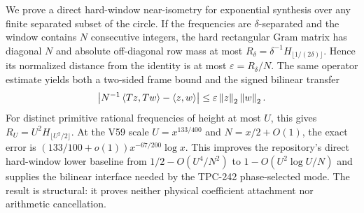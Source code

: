 We prove a direct hard-window near-isometry for exponential synthesis over any
finite separated subset of the circle.  If the frequencies are
$\delta$-separated and the window contains $N$ consecutive integers, the
hard rectangular Gram matrix has diagonal $N$ and absolute off-diagonal row
mass at most
$R_\delta=\delta^{-1}H_{\lfloor1/(2\delta)\rfloor}$.  Hence its normalized
distance from the identity is at most $\varepsilon=R_\delta/N$.  The same
operator estimate yields both a two-sided frame bound and the signed bilinear
transfer
\[
\left\lvert N^{-1}\left\langle Tz,Tw\right\rangle-\left\langle z,w\right\rangle\right\rvert
\leq\varepsilon\left\lVert z\right\rVert_2\left\lVert w\right\rVert_2.
\]
For distinct primitive rational frequencies of height at most $U$, this gives
$R_U=U^2H_{\lfloor U^2/2\rfloor}$.  At the V59 scale
$U=x^{133/400}$ and $N=x/2+O(1)$, the exact error is
$(133/100+o(1))x^{-67/200}\log x$.  This improves the repository's direct
hard-window lower baseline from $1/2-O(U^4/N^2)$ to
$1-O(U^2\log U/N)$ and supplies the bilinear interface needed by the TPC-242
phase-selected mode.  The result is structural: it proves neither physical
coefficient attachment nor arithmetic cancellation.
